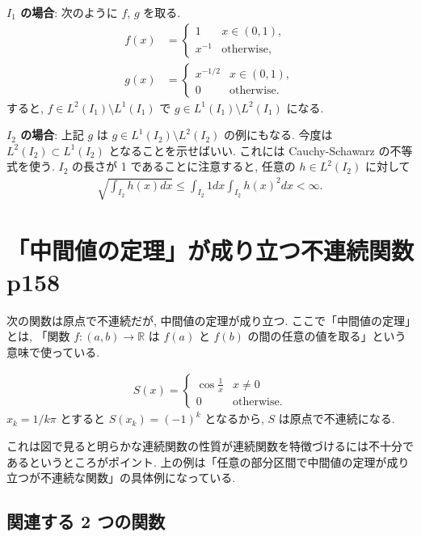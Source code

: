 \documentclass[openany, a4paper, oneside]{jsbook}
\begin{document}
\textbf{$I_1$ の場合}:
次のように $f$, $g$ を取る.
\begin{align}
 f (x)
 &=
 \begin{cases}
  1      & x \in (0, 1), \\
  x^{-1} & \mathrm{otherwise},
 \end{cases} \\
 g (x)
 &=
 \begin{cases}
  x^{-1/2} & x \in (0,1), \\
  0        & \mathrm{otherwise}.
 \end{cases}
\end{align}
すると, $f \in L^2 (I_1) \setminus L^1 (I_1)$ で $g \in L^1 (I_1) \setminus L^2 (I_1)$ になる.

\textbf{$I_2$ の場合}:
上記 $g$ は $g \in L^1 (I_2) \setminus L^2 (I_2)$ の例にもなる.
今度は $L^2 (I_2) \subset L^1 (I_2)$ となることを示せばいい.
これには Cauchy-Schawarz の不等式を使う.
$I_2$ の長さが 1 であることに注意すると, 任意の $h \in L^2 (I_2)$ に対して
\begin{align}
 \sqrt{ \int_{I_2} h (x) dx}
 \leq
 \int_{I_2} 1 dx \int_{I_2} h (x)^2 dx < \infty.
\end{align}
\section{「中間値の定理」が成り立つ不連続関数 \cite{WilliamDumham1} p158}

次の関数は原点で不連続だが, 中間値の定理が成り立つ.
ここで「中間値の定理」とは, 「関数 $f \colon (a, b) \to \mathbb{R}$ は $f (a)$ と $f (b)$ の間の任意の値を取る」という意味で使っている.

\begin{align}
 S (x)
 =
 \begin{cases}
  \cos \frac{1}{x} & x \neq 0 \\
  0 & \mathrm{otherwise}.
 \end{cases}
\end{align}
$x_k = 1 / k \pi$ とすると $S (x_k) = (-1)^k$ となるから, $S$ は原点で不連続になる.

これは図で見ると明らかな連続関数の性質が連続関数を特徴づけるには不十分であるというところがポイント.
上の例は「任意の部分区間で中間値の定理が成り立つが不連続な関数」の具体例になっている.
\subsection{関連する 2 つの関数}
\end{document}
